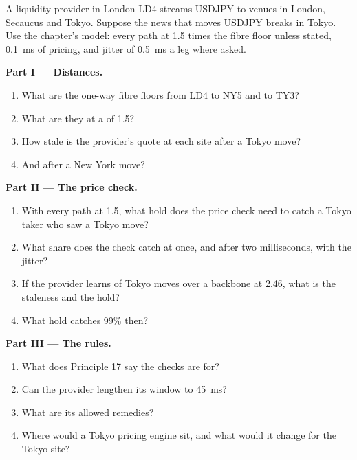 \begin{problem}\label{pb:nw:fx-connectivity:1}
A liquidity provider in London LD4 streams USDJPY to venues in London, Secaucus and Tokyo. Suppose the news that moves USDJPY
breaks in Tokyo. Use the chapter's model: every path at 1.5 times the fibre floor unless stated, \qty{0.1}{\milli\second} of pricing, and
jitter of \qty{0.5}{\milli\second} a leg where asked.

\medskip\noindent\textbf{Part I --- Distances.}
\begin{enumerate}
\item What are the one-way fibre floors from LD4 to NY5 and to TY3?
\item What are they at a  of 1.5?
\item How stale is the provider's quote at each site after a Tokyo move?
\item And after a New York move?
\end{enumerate}

\medskip\noindent\textbf{Part II --- The price check.}
\begin{enumerate}[resume]
\item With every path at 1.5, what hold does the price check need to catch a Tokyo taker who saw a Tokyo move?
\item What share does the check catch at once, and after two milliseconds, with the jitter?
\item If the provider learns of Tokyo moves over a backbone at 2.46, what is the staleness and the hold?
\item What hold catches 99\% then?
\end{enumerate}

\medskip\noindent\textbf{Part III --- The rules.}
\begin{enumerate}[resume]
\item What does Principle 17 say the checks are for?
\item Can the provider lengthen its window to \qty{45}{\milli\second}?
\item What are its allowed remedies?
\item Where would a Tokyo pricing engine sit, and what would it change for the Tokyo site?
\end{enumerate}


\end{problem}
